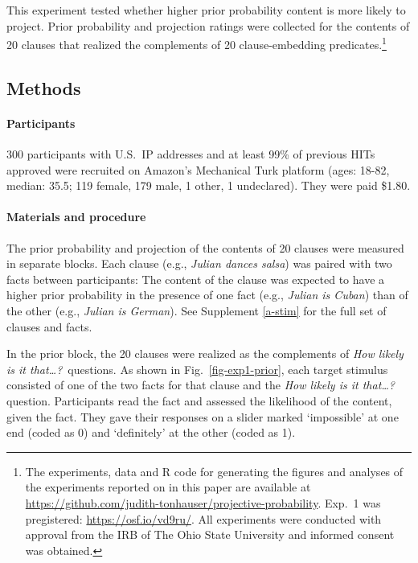 \documentclass[11pt,fleqn]{article}
\newcommand{\6}{\mbox{$[\hspace*{-.6mm}[$}}
\newcommand{\9}{\mbox{$]\hspace*{-.6mm}]$}}
\begin{document}
This experiment tested whether higher prior probability content is more likely to project. Prior probability and projection ratings were collected for the contents of 20 clauses that realized the complements of 20 clause-embedding predicates.\footnote{\label{f-github}The experiments, data and R code for generating the figures and analyses of the experiments reported on in this paper are available at \url{https://github.com/judith-tonhauser/projective-probability}. Exp.~1 was pregistered: \url{https://osf.io/vd9ru/}. All experiments were conducted with approval from the IRB of The Ohio State University and informed consent was obtained.}%

\subsection{Methods} 
 
\paragraph{Participants} 300 participants with U.S.\ IP addresses and at least 99\% of previous HITs approved were recruited on Amazon's Mechanical Turk platform (ages: 18-82, median: 35.5; 119 female, 179 male, 1 other, 1 undeclared). They were paid \$1.80.

\paragraph{Materials and procedure} The prior probability and projection of the contents of 20 clauses were measured in separate blocks. Each clause (e.g., \emph{Julian dances salsa}) was paired with two facts between participants: The content of the clause was expected to have a higher prior probability in the presence of one fact (e.g., \emph{Julian is Cuban}) than of the other (e.g., \emph{Julian is German}). See Supplement \ref{a-stim} for the full set of clauses and facts. 

In the prior block, the 20 clauses were realized as the complements of {\em How likely is it that\ldots?}~questions. As shown in Fig.~\ref{fig-exp1-prior}, each target stimulus consisted of one of the two facts for that clause and the {\em How likely is it that\ldots?} question. 
Participants read the fact and assessed the likelihood of the content, given the fact. They gave their responses on a slider marked `impossible' at one end (coded as 0) and `definitely' at the other (coded as 1). 
\end{document}
